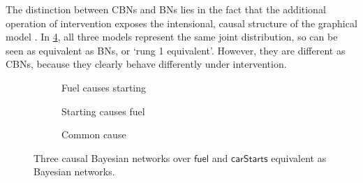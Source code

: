 \documentclass[11pt,a4paper]{article}
\begin{document}
The distinction between CBNs and BNs lies in the fact that the additional operation of intervention exposes the intensional, causal structure of the graphical model . In \cref{fig:rung2equiv}, all three models represent the same joint distribution, so can be seen as equivalent as BNs, or `rung 1 equivalent'. However, they are different as CBNs, because they clearly behave differently under intervention. 
\begin{figure}
    \centering
    \begin{subfigure}[b]{0.3\textwidth}
        \centering
        \caption{Fuel causes starting}
        \label{fig:miniforward}
    \end{subfigure}
    \hfill
    \begin{subfigure}[b]{0.3\textwidth}
        \centering
        \caption{Starting causes fuel}
        \label{fig:minireversed}
    \end{subfigure}
    \hfill
    \begin{subfigure}[b]{0.3\textwidth}
        \centering
        \caption{Common cause}
        \label{fig:minicommon}
    \end{subfigure}
    \caption{Three causal Bayesian networks over $\mathsf{fuel}$ and $\mathsf{carStarts}$ equivalent as Bayesian networks. }
    \label{fig:rung2equiv}
\end{figure}
\end{document}
